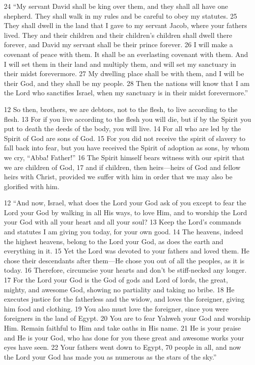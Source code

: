 \begin{bible}
24 ``My servant David shall be king over them, and they shall all have one shepherd. They shall walk in my rules and be careful to obey my statutes. 25 They shall dwell in the land that I gave to my servant Jacob, where your fathers lived. They and their children and their children's children shall dwell there forever, and David my servant shall be their prince forever. 26 I will make a covenant of peace with them. It shall be an everlasting covenant with them. And I will set them in their land and multiply them, and will set my sanctuary in their midst forevermore. 27 My dwelling place shall be with them, and I will be their God, and they shall be my people. 28 Then the nations will know that I am the Lord who sanctifies Israel, when my sanctuary is in their midst forevermore.'' 


12 So then, brothers, we are debtors, not to the flesh, to live according to the flesh. 13 For if you live according to the flesh you will die, but if by the Spirit you put to death the deeds of the body, you will live. 14 For all who are led by the Spirit of God are sons of God. 15 For you did not receive the spirit of slavery to fall back into fear, but you have received the Spirit of adoption as sons, by whom we cry, ``Abba! Father!'' 16 The Spirit himself bears witness with our spirit that we are children of God, 17 and if children, then heirs—heirs of God and fellow heirs with Christ, provided we suffer with him in order that we may also be glorified with him.


12 ``And now, Israel, what does the Lord your God ask of you except to fear the Lord your God by walking in all His ways, to love Him, and to worship the Lord your God with all your heart and all your soul?  13 Keep the Lord's commands and statutes I am giving you today, for your own good.  14 The heavens, indeed the highest heavens, belong to the Lord your God, as does the earth and everything in it.  15 Yet the Lord was devoted to your fathers and loved them. He chose their descendants after them—He chose you out of all the peoples, as it is today.  16 Therefore, circumcise your hearts and don't be stiff-necked any longer.  17 For the Lord your God is the God of gods and Lord of lords, the great, mighty, and awesome God, showing no partiality and taking no bribe.  18 He executes justice for the fatherless and the widow, and loves the foreigner, giving him food and clothing.  19 You also must love the foreigner, since you were foreigners in the land of Egypt.  20 You are to fear Yahweh your God and worship Him. Remain faithful to Him and take oaths in His name.  21 He is your praise and He is your God, who has done for you these great and awesome works your eyes have seen.  22 Your fathers went down to Egypt, 70 people in all, and now the Lord your God has made you as numerous as the stars of the sky.''


\end{bible}
